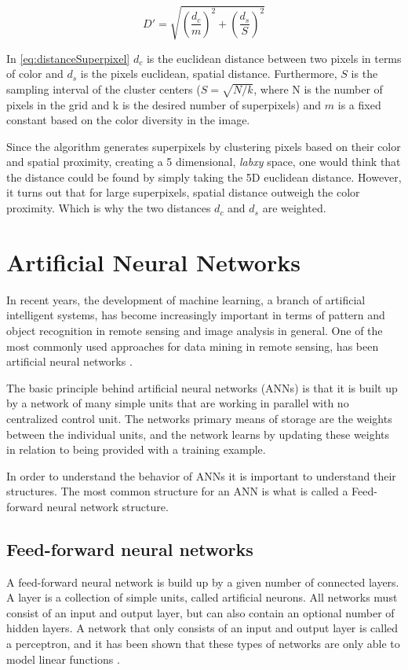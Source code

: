 \begin{equation}
	D'=\sqrt{\left(\frac{d_{c}}{m}\right)^{2} + \left(\frac{d_{s}}{S}\right)^{2}}
	\label{eq:distanceSuperpixel}
\end{equation}

In \autoref{eq:distanceSuperpixel} $d_{c}$ is the euclidean distance between two pixels in terms of color and $d_{s}$ is the pixels euclidean, spatial distance. Furthermore, $S$ is the sampling interval of the cluster centers ($S = \sqrt{N/k}$, where N is the number of pixels in the grid and k is the desired number of superpixels) and $m$ is a fixed constant based on the color diversity in the image.

Since the algorithm generates superpixels by clustering pixels based on their color and spatial proximity, creating a 5 dimensional, \textit{labxy} space, one would think that the distance could be found by simply taking the 5D euclidean distance. However, it turns out that for large superpixels, spatial distance outweigh the color proximity. Which is why the two distances $d_{c}$ and $d_{s}$ are weighted.

\section{Artificial Neural Networks}
In recent years, the development of machine learning, a branch of artificial intelligent systems, has become increasingly important in terms of pattern and object recognition in remote sensing and image analysis in general. One of the most commonly used approaches for data mining in remote sensing, has been artificial neural networks \cite{Lary2016}.

The basic principle behind artificial neural networks (ANNs) is that it is built up by a network of many simple units that are working in parallel with no centralized control unit. The networks primary means of storage are the weights between the individual units, and the network learns by updating these weights in relation to being provided with a training example.

In order to understand the behavior of ANNs it is important to understand their structures. The most common structure for an ANN is what is called a Feed-forward neural network structure.

\subsection{Feed-forward neural networks}
A feed-forward neural network is build up by a given number of connected layers. A layer is a collection of simple units, called artificial neurons. All networks must consist of an input and output layer, but can also contain an optional number of hidden layers. A network that only consists of an input and output layer is called a perceptron, and it has been shown that these types of networks are only able to model linear functions \citep{Minsky1969}.


